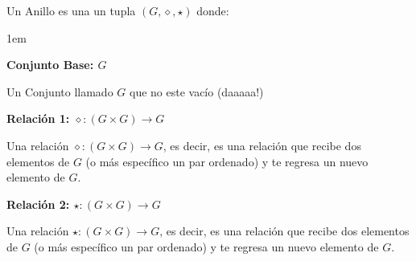 \documentclass[12pt, fleqn]{report}                             %
\newenvironment{Indentation}[1][0.75em]                         %
    {\begin{adjustwidth}{#1}{}}                                     %
    {\end{adjustwidth}}                                             %
\begin{document}
                Un Anillo es una un tupla $(G, \diamond, \star)$ donde:
                \begin{Indentation}[1em]
                \begin{itemize}
                \small{
                    
                    \item
                        \textbf{Conjunto Base: $G$}

                        Un Conjunto llamado $G$ que no este vacío (daaaaa!)

                    \item
                        \textbf{Relación 1: $\diamond: (G \times  G) \to G$}

                        Una relación $\diamond: (G \times  G) \to G$, es decir, es una relación
                        que recibe dos elementos de $G$ (o más específico un par ordenado) y te
                        regresa un nuevo elemento de $G$.

                    \item
                        \textbf{Relación 2: $\star: (G \times  G) \to G$}

                        Una relación $\star: (G \times  G) \to G$, es decir, es una relación
                        que recibe dos elementos de $G$ (o más específico un par ordenado) y te
                        regresa un nuevo elemento de $G$.
                }
                \end{itemize}
                \end{Indentation}
\end{document}
